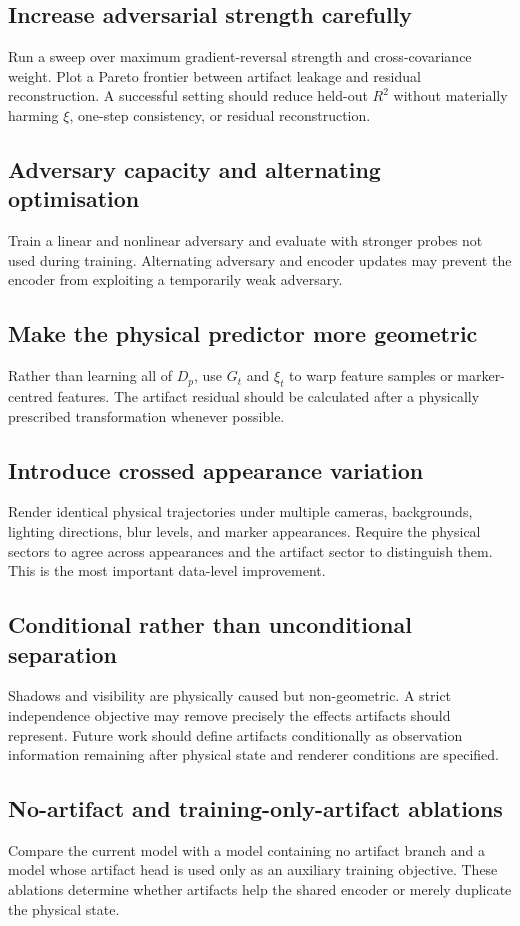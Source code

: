 \documentclass[11pt,a4paper]{article}
\begin{document}
\subsection{Increase adversarial strength carefully}
Run a sweep over maximum gradient-reversal strength and cross-covariance weight. Plot a Pareto frontier between artifact leakage and residual reconstruction. A successful setting should reduce held-out $R^2$ without materially harming $\xi$, one-step consistency, or residual reconstruction.

\subsection{Adversary capacity and alternating optimisation}
Train a linear and nonlinear adversary and evaluate with stronger probes not used during training. Alternating adversary and encoder updates may prevent the encoder from exploiting a temporarily weak adversary.

\subsection{Make the physical predictor more geometric}
Rather than learning all of $D_p$, use $G_t$ and $\xi_t$ to warp feature samples or marker-centred features. The artifact residual should be calculated after a physically prescribed transformation whenever possible.

\subsection{Introduce crossed appearance variation}
Render identical physical trajectories under multiple cameras, backgrounds, lighting directions, blur levels, and marker appearances. Require the physical sectors to agree across appearances and the artifact sector to distinguish them. This is the most important data-level improvement.

\subsection{Conditional rather than unconditional separation}
Shadows and visibility are physically caused but non-geometric. A strict independence objective may remove precisely the effects artifacts should represent. Future work should define artifacts conditionally as observation information remaining after physical state and renderer conditions are specified.

\subsection{No-artifact and training-only-artifact ablations}
Compare the current model with a model containing no artifact branch and a model whose artifact head is used only as an auxiliary training objective. These ablations determine whether artifacts help the shared encoder or merely duplicate the physical state.
\end{document}
